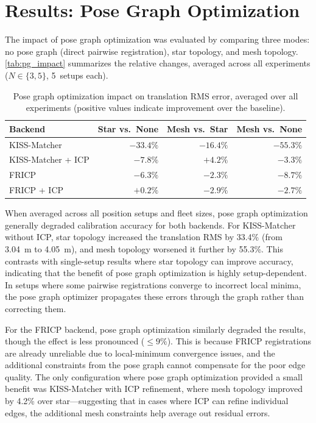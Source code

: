 \section{Results: Pose Graph Optimization}
\label{sec:pose_graph_impact}

The impact of pose graph optimization was evaluated by comparing
three modes: no pose graph (direct pairwise registration), star
topology, and mesh topology.
\autoref{tab:pg_impact} summarizes the relative changes, averaged
across all experiments ($N \in \{3, 5\}$, 5~setups each).

\begin{table}[htbp]
    \centering
    \caption{Pose graph optimization impact on translation RMS error,
             averaged over all experiments
             (positive values indicate improvement over the baseline).}
    \label{tab:pg_impact}
    \begin{tabular}{l r r r}
        \toprule
        \textbf{Backend}
            & \textbf{Star vs.\ None}
            & \textbf{Mesh vs.\ Star}
            & \textbf{Mesh vs.\ None} \\
        \midrule
        KISS-Matcher       & $-33.4\%$ & $-16.4\%$ & $-55.3\%$ \\
        KISS-Matcher + ICP & $-7.8\%$  & $+4.2\%$  & $-3.3\%$ \\
        FRICP              & $-6.3\%$  & $-2.3\%$  & $-8.7\%$ \\
        FRICP + ICP        & $+0.2\%$  & $-2.9\%$  & $-2.7\%$ \\
        \bottomrule
    \end{tabular}
\end{table}

When averaged across all position setups and fleet sizes,
pose graph optimization generally degraded calibration accuracy
for both backends.
For KISS-Matcher without ICP, star topology increased the
translation RMS by 33.4\% (from \SI{3.04}{\metre} to
\SI{4.05}{\metre}), and mesh topology worsened it further by 55.3\%.
This contrasts with single-setup results where star topology can
improve accuracy, indicating that the benefit of pose graph
optimization is highly setup-dependent.
In setups where some pairwise registrations converge to incorrect
local minima, the pose graph optimizer propagates these errors
through the graph rather than correcting them.

For the FRICP backend, pose graph optimization similarly degraded
the results, though the effect is less pronounced ($\leq 9\%$).
This is because FRICP registrations are already unreliable due to
local-minimum convergence issues, and the additional constraints
from the pose graph cannot compensate for the poor edge quality.
The only configuration where pose graph optimization provided
a small benefit was KISS-Matcher with ICP refinement, where mesh
topology improved by 4.2\% over star---suggesting that in cases
where ICP can refine individual edges, the additional mesh
constraints help average out residual errors.


